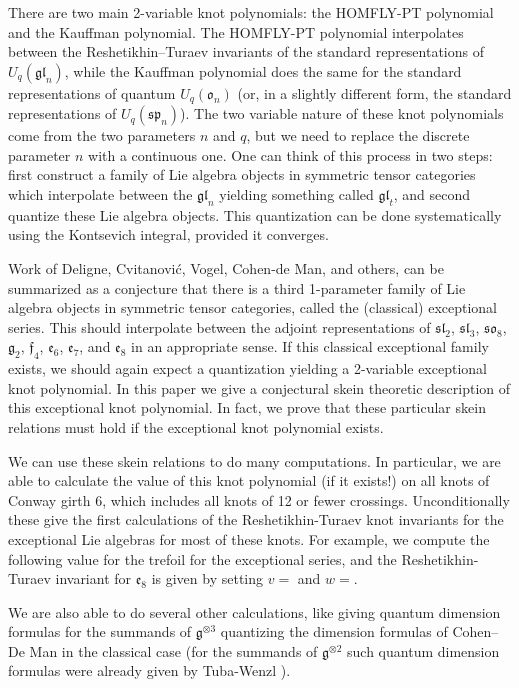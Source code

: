 \documentclass[12pt]{amsart}
\begin{document}
There are two main 2-variable knot polynomials: the HOMFLY-PT polynomial and
the Kauffman polynomial.  The HOMFLY-PT polynomial interpolates between the
Reshetikhin--Turaev invariants of the standard representations of
$U_q(\mathfrak{gl}_n)$, while the Kauffman polynomial does the same for the
standard representations of quantum $U_q(\mathfrak{o}_n)$ (or, in a slightly
different form, the standard representations of $U_q(\mathfrak{sp}_n)$).  The
two variable nature of these knot polynomials come from the two parameters $n$
and $q$, but we need to replace the discrete parameter $n$ with a continuous one.  
One can think of this process in two steps: first construct a family
of Lie algebra objects in symmetric tensor categories which interpolate
between the $\mathfrak{gl}_n$ yielding something called $\mathfrak{gl}_t$, and
second quantize these Lie algebra objects.   This quantization can be done
systematically using the Kontsevich integral, provided it converges.

Work of Deligne, Cvitanović, Vogel, Cohen-de Man, and others, can be summarized as a
conjecture that there is a third 1-parameter family of Lie algebra objects in
symmetric tensor categories, called the (classical) exceptional series.
This should interpolate between the
adjoint representations of $\mathfrak{sl}_2$, $\mathfrak{sl}_3$,
$\mathfrak{so}_8$, $\mathfrak{g}_2$, $\mathfrak{f}_4$, $\mathfrak{e}_6$,
$\mathfrak{e}_7$, and $\mathfrak{e}_8$ in an appropriate sense.  If this classical exceptional family
exists, we should again expect a quantization yielding a 2-variable
exceptional knot polynomial.  In this paper we give a conjectural skein
theoretic description of this exceptional knot polynomial. In fact, we
prove that these particular skein relations must hold if the exceptional knot polynomial
exists.

We can use these skein relations to do many computations.  In
particular, we are able to calculate the value of this knot polynomial (if it
exists!) on all knots of Conway girth 6, which includes all knots of 12 or
fewer crossings.  Unconditionally these give the first calculations of the Reshetikhin-Turaev knot invariants for the exceptional Lie algebras for most of these knots.  For example, we compute the following value for the trefoil for the exceptional series, and the Reshetikhin-Turaev invariant for $\mathfrak{e}_8$ is given by setting $v=$ and $w=$.


We are also able to do several other calculations, like giving quantum dimension formulas for the summands of $\mathfrak{g}^{\otimes 3}$ quantizing the dimension formulas of Cohen--De Man \cite{???} in the classical case (for the summands of $\mathfrak{g}^{\otimes 2}$ such quantum dimension formulas were already given by Tuba-Wenzl \cite{???}).
\end{document}

